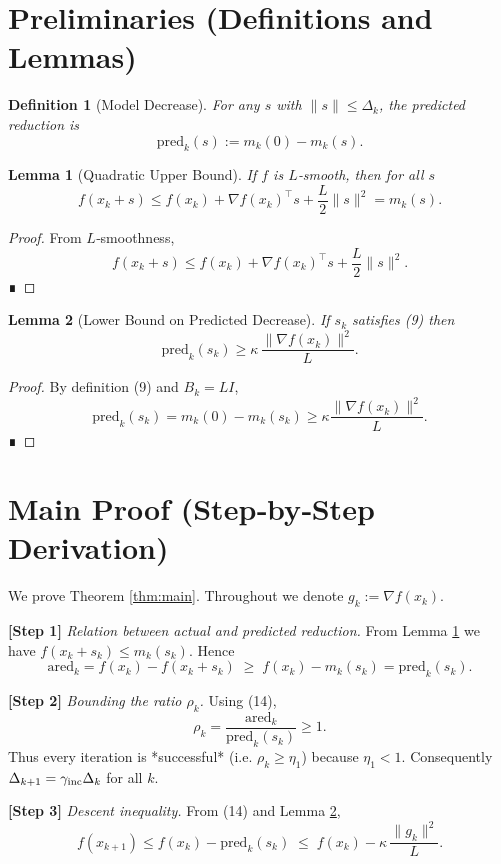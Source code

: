 \documentclass{article}
\newtheorem{lemma}{Lemma}
\newtheorem{definition}{Definition}
\begin{document}
\newpage
\section*{Preliminaries (Definitions and Lemmas)}
\begin{definition}[Model Decrease]\label{def:pred}
For any $s$ with $\|s\|\le\Delta_k$, the predicted reduction is 
\[
\text{pred}_k(s):=m_k(0)-m_k(s).
\]
\end{definition}
\begin{lemma}[Quadratic Upper Bound]\label{lem:quad}
If $f$ is $L$‑smooth, then for all $s$
\[
f(x_k+s)\le f(x_k)+\nabla f(x_k)^{\top}s+\frac{L}{2}\|s\|^2=m_k(s).
\tag{12}
\]
\end{lemma}
\begin{proof}
From $L$‑smoothness,
\[
f(x_k+s)\le f(x_k)+\nabla f(x_k)^{\top}s+\frac{L}{2}\|s\|^2 .
\]
∎
\end{proof}
\begin{lemma}[Lower Bound on Predicted Decrease]\label{lem:predlb}
If $s_k$ satisfies (9) then
\[
\text{pred}_k(s_k)\ge \kappa\,\frac{\|\nabla f(x_k)\|^2}{L}.
\tag{13}
\]
\end{lemma}
\begin{proof}
By definition (9) and $B_k=L I$,
\[
\text{pred}_k(s_k)=m_k(0)-m_k(s_k)\ge\kappa\frac{\|\nabla f(x_k)\|^2}{L}.
\]
∎
\end{proof}

\section*{Main Proof (Step‑by‑Step Derivation)}
We prove Theorem \ref{thm:main}. Throughout we denote $g_k:=\nabla f(x_k)$.

\noindent\textbf{[Step 1]} \emph{Relation between actual and predicted reduction.}  
From Lemma \ref{lem:quad} we have $f(x_k+s_k)\le m_k(s_k)$. Hence
\[
\text{ared}_k = f(x_k)-f(x_k+s_k)
\;\ge\; f(x_k)-m_k(s_k)=\text{pred}_k(s_k).
\tag{14}
\]

\noindent\textbf{[Step 2]} \emph{Bounding the ratio $\rho_k$.}  
Using (14),
\[
\rho_k=\frac{\text{ared}_k}{\text{pred}_k(s_k)}\ge 1 .
\tag{15}
\]
Thus every iteration is *successful* (i.e. $\rho_k\ge\eta_1$) because $\eta_1<1$. Consequently $\Delta_{k+1}=\gamma_{\rm inc}\Delta_k$ for all $k$.

\noindent\textbf{[Step 3]} \emph{Descent inequality.}  
From (14) and Lemma \ref{lem:predlb},
\[
f(x_{k+1})\le f(x_k)-\text{pred}_k(s_k)
\;\le\;
f(x_k)-\kappa\,\frac{\|g_k\|^2}{L}.
\tag{16}
\]
\end{document}
